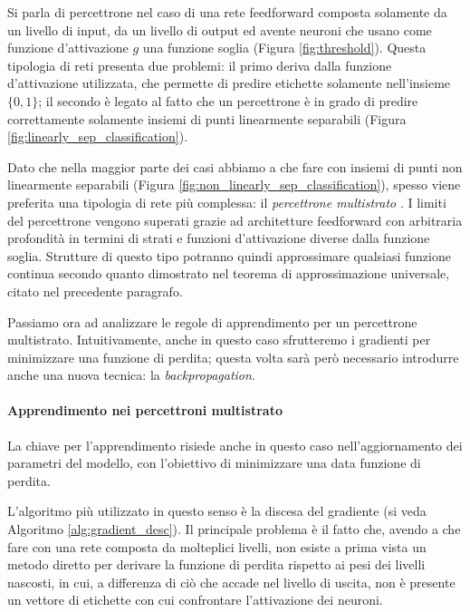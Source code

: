 \documentclass[../../main.tex]{subfiles}
\begin{document}
Si parla di percettrone nel caso di una rete feedforward composta solamente da un livello di input, da un livello di output ed avente neuroni che usano come funzione d'attivazione $g$ una funzione soglia (Figura \ref{fig:threshold}). Questa tipologia di reti presenta due problemi: il primo deriva dalla funzione d'attivazione utilizzata, che permette di predire etichette solamente nell'insieme $\{0,1\}$; il secondo è legato al fatto che un percettrone è in grado di predire correttamente solamente insiemi di punti linearmente separabili (Figura \ref{fig:linearly_sep_classification}).

Dato che nella maggior parte dei casi abbiamo a che fare con insiemi di punti non linearmente separabili (Figura \ref{fig:non_linearly_sep_classification}), spesso viene preferita una tipologia di rete più complessa: il \textit{percettrone multistrato} \cite{mcculloch43a}. I limiti del percettrone vengono superati grazie ad architetture feedforward con arbitraria profondità in termini di strati e funzioni d'attivazione diverse dalla funzione soglia. Strutture di questo tipo potranno quindi approssimare qualsiasi funzione continua secondo quanto dimostrato nel teorema di approssimazione universale, citato nel precedente paragrafo.

Passiamo ora ad analizzare le regole di apprendimento per un percettrone multistrato. Intuitivamente, anche in questo caso sfrutteremo i gradienti per minimizzare una funzione di perdita; questa volta sarà però necessario introdurre anche una nuova tecnica: la \textit{backpropagation}.

\paragraph{Apprendimento nei percettroni multistrato}
La chiave per l'apprendimento risiede anche in questo caso nell'aggiornamento dei parametri del modello, con l'obiettivo di minimizzare una data funzione di perdita.

L'algoritmo più utilizzato in questo senso è la discesa del gradiente (si veda Algoritmo \ref{alg:gradient_desc}). Il principale problema è il fatto che, avendo a che fare con una rete composta da molteplici livelli, non esiste a prima vista un metodo diretto per derivare la funzione di perdita rispetto ai pesi dei livelli nascosti, in cui, a differenza di ciò che accade nel livello di uscita, non è presente un vettore di etichette con cui confrontare l'attivazione dei neuroni.
\end{document}
